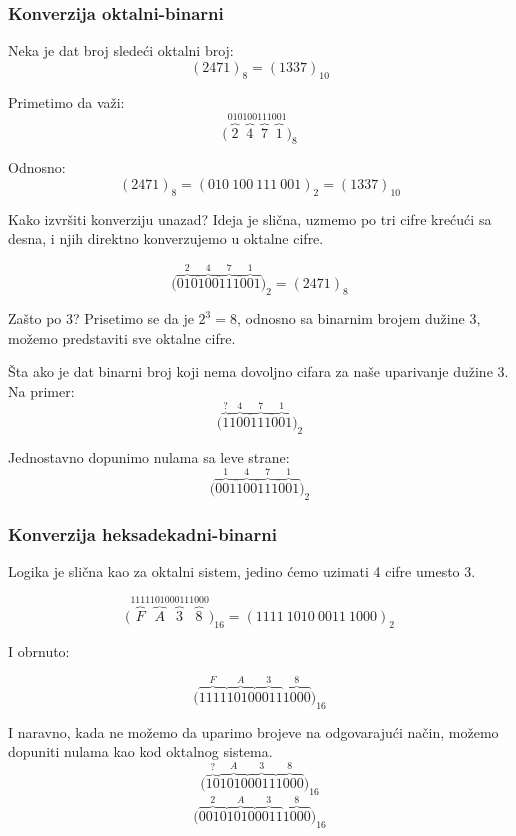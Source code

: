 \documentclass[a4paper]{article}
\begin{document}
\subsubsection{Konverzija oktalni-binarni}

Neka je dat broj sledeći oktalni broj:
$$ (2471)_8 = (1337)_{10}$$

Primetimo da važi:
$$ \big(\overbrace{2}^{010}\overbrace{4}^{100}\overbrace{7}^{111}\overbrace{1}^{001}\big)_8 $$

Odnosno:
$$ (2471)_8 = (010 \ 100 \ 111 \ 001)_2 = (1337)_{10} $$

Kako izvršiti konverziju unazad? Ideja je slična, uzmemo po tri cifre krećući sa desna, i njih direktno konverzujemo u oktalne cifre.

$$ \big(\overbrace{010}^{2}\overbrace{100}^{4}\overbrace{111}^{7}\overbrace{001}^{1}\big)_2 = (2471)_8 $$

Zašto po 3? Prisetimo se da je $2^3=8$, odnosno sa binarnim brojem dužine 3, možemo predstaviti sve oktalne cifre.

Šta ako je dat binarni broj koji nema dovoljno cifara za naše uparivanje dužine 3. Na primer:
$$ \big(\overbrace{1}^{?}\overbrace{100}^{4}\overbrace{111}^{7}\overbrace{001}^{1}\big)_2 $$

Jednostavno dopunimo nulama sa leve strane:
$$ \big(\overbrace{001}^{1}\overbrace{100}^{4}\overbrace{111}^{7}\overbrace{001}^{1}\big)_2 $$

\subsubsection{Konverzija heksadekadni-binarni}
Logika je slična kao za oktalni sistem, jedino ćemo uzimati 4 cifre umesto 3.

$$ \big(\overbrace{F}^{1111}\overbrace{A}^{1010}\overbrace{3}^{0011}\overbrace{8}^{1000}\big)_{16} = (1111 \ 1010 \ 0011 \ 1000)_2$$

I obrnuto:

$$ \big(\overbrace{1111}^{F}\overbrace{1010}^{A}\overbrace{0011}^{3}\overbrace{1000}^{8}\big)_{16} $$

I naravno, kada ne možemo da uparimo brojeve na odgovarajući način, možemo dopuniti nulama kao kod oktalnog sistema.
$$ \big(\overbrace{10}^{?}\overbrace{1010}^{A}\overbrace{0011}^{3}\overbrace{1000}^{8}\big)_{16} $$
$$ \big(\overbrace{0010}^{2}\overbrace{1010}^{A}\overbrace{0011}^{3}\overbrace{1000}^{8}\big)_{16} $$


\end{document}
